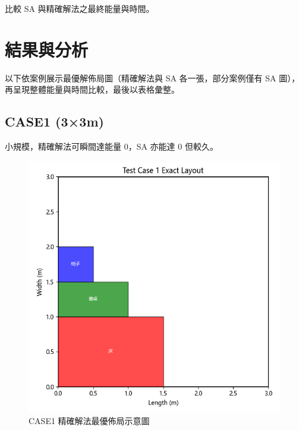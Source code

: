 \documentclass[conference]{IEEEtran}
\begin{document}
比較 SA 與精確解法之最終能量與時間。

\section{結果與分析}
以下依案例展示最優解佈局圖（精確解法與 SA 各一張，部分案例僅有 SA 圖），再呈現整體能量與時間比較，最後以表格彙整。

\subsection{CASE1 (3×3m)}
小規模，精確解法可瞬間達能量 0，SA 亦能達 0 但較久。

\begin{figure}[!htbp]
    \centering
    \includegraphics[width=\columnwidth]{exact_layout_test_case_1.png} 
    \caption{CASE1 精確解法最優佈局示意圖}
    \label{fig:case1_exact_solver} %
\end{figure}
\end{document}
